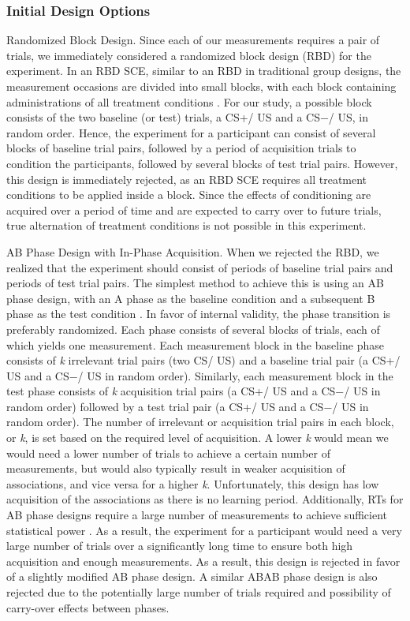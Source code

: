 \documentclass{jote-article}
\begin{document}
\subsubsection{Initial Design Options}

Randomized Block Design. Since each of our measurements requires a pair of trials, we immediately considered a randomized block design (RBD) for the experiment. In an RBD SCE, similar to an RBD in traditional group designs, the measurement occasions are divided into small blocks, with each block containing administrations of all treatment conditions \cite{bibr45}. For our study, a possible block consists of the two baseline (or test) trials, a CS+/ US and a CS−/ US, in random order. Hence, the experiment for a participant can consist of several blocks of baseline trial pairs, followed by a period of acquisition trials to condition the participants, followed by several blocks of test trial pairs. However, this design is immediately rejected, as an RBD SCE requires all treatment conditions to be applied inside a block. Since the effects of conditioning are acquired over a period of time and are expected to carry over to future trials, true alternation of treatment conditions is not possible in this experiment.

AB Phase Design with In-Phase Acquisition. When we rejected the RBD, we realized that the experiment should consist of periods of baseline trial pairs and periods of test trial pairs. The simplest method to achieve this is using an AB phase design, with an A phase as the baseline condition and a subsequent B phase as the test condition \cite{bibr9}. In favor of internal validity, the phase transition is preferably randomized. Each phase consists of several blocks of trials, each of which yields one measurement. Each measurement block in the baseline phase consists of \emph{k} irrelevant trial pairs (two CS/ US) and a baseline trial pair (a CS+/ US and a CS−/ US in random order). Similarly, each measurement block in the test phase consists of \emph{k} acquisition trial pairs (a CS+/ US and a CS−/ US in random order) followed by a test trial pair (a CS+/ US and a CS−/ US in random order). The number of irrelevant or acquisition trial pairs in each block, or \emph{k}, is set based on the required level of acquisition. A lower \emph{k} would mean we would need a lower number of trials to achieve a certain number of measurements, but would also typically result in weaker acquisition of associations, and vice versa for a higher \emph{k}. Unfortunately, this design has low acquisition of the associations as there is no learning period. Additionally, RTs for AB phase designs require a large number of measurements to achieve sufficient statistical power \cite{bibr46} \cite{bibr18}. As a result, the experiment for a participant would need a very large number of trials over a significantly long time to ensure both high acquisition and enough measurements. As a result, this design is rejected in favor of a slightly modified AB phase design. A similar ABAB phase design is also rejected due to the potentially large number of trials required and possibility of carry-over effects between phases.
\end{document}
